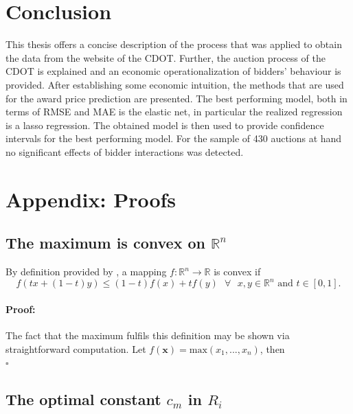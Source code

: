 \documentclass[a4paper,12pt, headsepline]{scrartcl}
\newenvironment{proof}{\paragraph{Proof:}}{\hfill$\square$}
\numberwithin{equation}{section}
\begin{document}
\section{Conclusion}\label{sec:con}
 This thesis offers a concise description of the process that was applied to obtain the data from the website of the CDOT. Further, the auction process of the CDOT is explained and an economic operationalization of bidders' behaviour is provided. After establishing some economic intuition, the methods that are used for the award price prediction are presented. The best performing model, both in terms of RMSE and MAE is the elastic net, in particular the realized regression is a lasso regression. The obtained model is then used to provide confidence intervals for the best performing model. For the sample of 430 auctions at hand no significant effects of bidder interactions was detected.
 \newpage
 \printbibliography
 \newpage
 \appendix
 \section{Appendix: Proofs}
 \subsection{The maximum is convex on $\mathbb{R}^n$}\label{App:A1}
 By definition provided by \citet{rudin76}, a mapping $f: \mathbb{R}^n \rightarrow \mathbb{R}$ is convex if
 \[
 f(tx+ (1-t)y) \leq (1-t)f(x)+tf(y) \text{ }\forall\text{ } x, y \in \mathbb{R}^n \text{ and } t \in [0, 1].
 \]
 \begin{proof}
 The fact that the maximum fulfils this definition may be shown via straightforward computation. 
 Let $f(\bm{x}) = \text{max}(x_1, ..., x_n)$, then 
 \[
 
 \]
 \end{proof}
 \subsection{The optimal constant $c_m$ in $R_i$}\label{App:A2}
\end{document}
